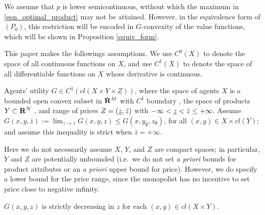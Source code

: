 We assume that $p$ is lower semicontinuous, without which the maximum in \eqref{eqn_optimal_product} may not be attained. However, in the equivalence form of $(P_0)$, this restriction will be encoded in $G$-convexity of the value functions, which will be shown in Proposition \ref{equiv_form}.\medskip


This paper makes the followings assumptions. {We use $C^0(X)$ to denote the space of all continuous functions on $X$, and use $C^1(X)$ to denote the space of all differentiable functions on $X$ whose derivative is continuous.}\medskip%




\begin{assumption}\label{assmp:Gregular}
	Agents' utility $G \in C^{1}(cl(X\times Y \times Z))$, where the space of agents $X$ is a bounded open convex subset in ${\mathbf R}^M$ with $C^1$ boundary%
	, the space of products $Y \subset {\mathbf R}^N$%
	, and range of prices $Z=(\munderbar z,\bar z)$ with $-\infty < \munderbar z < \bar z \le +\infty$. {Assume $G(x,y,\bar{z}) := \lim_{z\longrightarrow \bar{z}} G(x,y,z) \le G(x, y_{\emptyset}, z_{\emptyset})$, for all $(x,y) \in X \times cl(Y)$; and assume this inequality is strict when $\bar{z} = +\infty$.}
\end{assumption}



Here we do not necessarily assume $X$, $Y$, and $Z$ are compact spaces; in particular, $Y$ and $Z$ are potentially unbounded %
(i.e.\ we do not set  \textit{a priori} bounds for product attributes or an \textit{a priori} upper bound for price). However, we do specify a lower bound for the price range, since the monopolist has no incentive to set price close to negative infinity. %
\medskip



\begin{assumption}\label{assmp:Gdecreasing}
	$G(x,y,z)$ is strictly decreasing in $z$ %
	for each $(x,y) \in cl(X \times Y)$.
\end{assumption}





